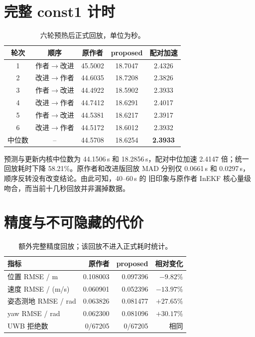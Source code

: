 \documentclass[11pt,a4paper]{ctexart}
\begin{document}
\section{完整 const1 计时}

\begin{table}[h]
\centering
\caption{六轮预热后正式回放，单位为秒。}
\begin{tabular}{ccccc}
\toprule
轮次 & 顺序 & 原作者 & proposed & 配对加速\\
\midrule
1 & 作者$\to$改进 & 45.5002 & 18.7047 & 2.4326\\
2 & 改进$\to$作者 & 44.6035 & 18.7208 & 2.3826\\
3 & 作者$\to$改进 & 44.4922 & 18.5902 & 2.3933\\
4 & 改进$\to$作者 & 44.7412 & 18.6291 & 2.4017\\
5 & 作者$\to$改进 & 44.5381 & 18.6217 & 2.3917\\
6 & 改进$\to$作者 & 44.5172 & 18.6012 & 2.3932\\
\midrule
中位数 & -- & 44.5708 & 18.6254 & \textbf{2.3933}\\
\bottomrule
\end{tabular}
\end{table}

预测与更新内核中位数为 44.1506\,s 和 18.2856\,s，配对中位加速
2.4147 倍；统一回放耗时下降 58.21\%。原作者和改进版回放 MAD 分别仅
0.0661\,s 和 0.0297\,s，顺序反转没有改变结论。由此可知，40--60\,s 的
旧印象与原作者 InEKF 核心量级吻合，而当前十几秒回放并非漏掉数据。

\section{精度与不可隐藏的代价}

\begin{table}[h]
\centering
\caption{额外完整精度回放；该回放不进入正式耗时统计。}
\begin{tabular}{lrrr}
\toprule
指标 & 原作者 & proposed & 相对变化\\
\midrule
位置 RMSE / m & 0.108003 & 0.097396 & $-9.82\%$\\
速度 RMSE / (m/s) & 0.060901 & 0.052396 & $-13.97\%$\\
姿态测地 RMSE / rad & 0.063826 & 0.081477 & $+27.65\%$\\
yaw RMSE / rad & 0.062300 & 0.081096 & $+30.17\%$\\
UWB 拒绝数 & 0/67205 & 0/67205 & 相同\\
\bottomrule
\end{tabular}
\end{table}
\end{document}
